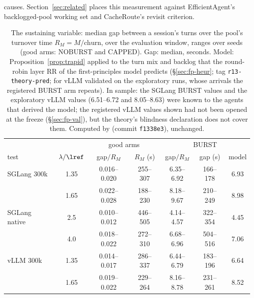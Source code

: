 causes. Section~\ref{sec:related} places this measurement against EfficientAgent's backlogged-pool working set and CacheRoute's revisit criterion.

\begin{table}[t]
\centering\footnotesize
\caption{The sustaining variable: median gap between a session's turns over the pool's turnover time $R_M=M/\text{churn}$, over the evaluation window, ranges over seeds (good arms: NOBURST and CAPPED). Gap: median, seconds. Model: Proposition~\ref{prop:trapid} applied to the turn mix and backlog that the round-robin layer RR of the first-principles model predicts (\S\ref{sec:fp-heur}; tag \texttt{r13-theory-pred}; for vLLM validated on the exploratory runs, whose arrivals the registered BURST arm repeats). In sample: the SGLang BURST values and the exploratory vLLM values (6.51--6.72 and 8.05--8.63) were known to the agents that derived the model; the registered vLLM values shown had not been opened at the freeze (\S\ref{sec:fp-val}), but the theory's blindness declaration does not cover them. Computed by  (commit \texttt{f1338e3}), unchanged.}\label{tab:gapR}
\setlength{\tabcolsep}{2pt}
\begin{tabular}{@{}l c c c c c c@{}}
\toprule
 & & \multicolumn{2}{c}{good arms} & \multicolumn{3}{c}{BURST}\\
test & $\lambda/\lref$ & gap$/R_M$ & $R_M$ (s) & gap$/R_M$ & gap (s) & model\\
\midrule
SGLang 300k & 1.35 & 0.016--0.020 & 255--307 & 6.35--6.92 & 166--178 & 6.93\\
            & 1.65 & 0.022--0.028 & 188--230 & 8.18--9.67 & 210--249 & 8.98\\
SGLang native & 2.5 & 0.010--0.012 & 446--505 & 4.14--4.57 & 322--354 & 4.45\\
            & 4.0 & 0.018--0.022 & 272--310 & 6.68--6.96 & 504--516 & 7.06\\
vLLM 300k   & 1.35 & 0.014--0.017 & 286--337 & 6.44--6.79 & 183--196 & 6.64\\
            & 1.65 & 0.019--0.022 & 229--264 & 8.16--8.78 & 231--261 & 8.52\\
\bottomrule
\end{tabular}
\end{table}

